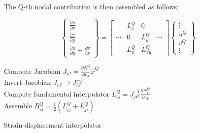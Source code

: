The $Q$-th nodal contribution is then assembled as follows;


\begin{equation}
\begin{Bmatrix}
\frac{\partial u}{\partial x}\\
\frac{\partial v}{\partial y}\\
\frac{\partial u}{\partial y} + \frac{\partial v}{\partial x}
\end{Bmatrix} =
\begin{bmatrix}
 &L_x^Q &0 \\
\cdots &0 &L_y^Q &\cdots\\
 &L_y^Q &L_{xy}^Q
\end{bmatrix}
\begin{Bmatrix}
\vdots\\
u^Q\\
v^Q\\
\vdots
\end{Bmatrix}
\label{eq:strain inter}
\end{equation}

\begin{algorithm}[H]
\SetAlgoLined
{}
Compute Jacobian ${J_{iJ}} = \frac{{\partial N_i^Q}}{{\partial {r_J}}}{{\hat x}^Q}$\\
Invert Jacobian  ${J_{iJ}} \to J_{iJ}^{ - 1}$\\
Compute fundamental interpolator $L_{ij}^Q = J_{jP}^{ - 1}\frac{{\partial N_i^Q}}{{\partial {r_P}}}$\\
Assemble $B_{ij}^Q = \frac{1}{2}\left( {L_{ij}^Q + L_{ji}^Q} \right)$ 
\caption{Strain-displacement interpolator}
\end{algorithm}


